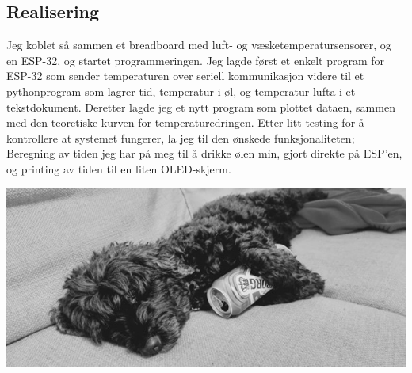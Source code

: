 \documentclass{article}
\begin{document}
\subsection{Realisering}
\label{Realisering}
Jeg koblet så sammen et breadboard med luft- og væsketemperatursensorer, og en ESP-32, og startet programmeringen.
Jeg lagde først et enkelt program for ESP-32 som sender temperaturen over seriell kommunikasjon videre til et pythonprogram som lagrer tid, temperatur i øl, og temperatur lufta i et tekstdokument. Deretter lagde jeg et nytt program som plottet dataen, sammen med den teoretiske kurven for temperaturedringen.
Etter litt testing for å kontrollere at systemet fungerer, la jeg til den ønskede funksjonaliteten; Beregning av tiden jeg har på meg til å drikke ølen min, gjort direkte på ESP'en, og printing av tiden til en liten OLED-skjerm.
\vfill
\begin{center}
    \includegraphics[width=15cm]{Tinka_med_pils.jpg}
\end{center}
\newpage
\end{document}
